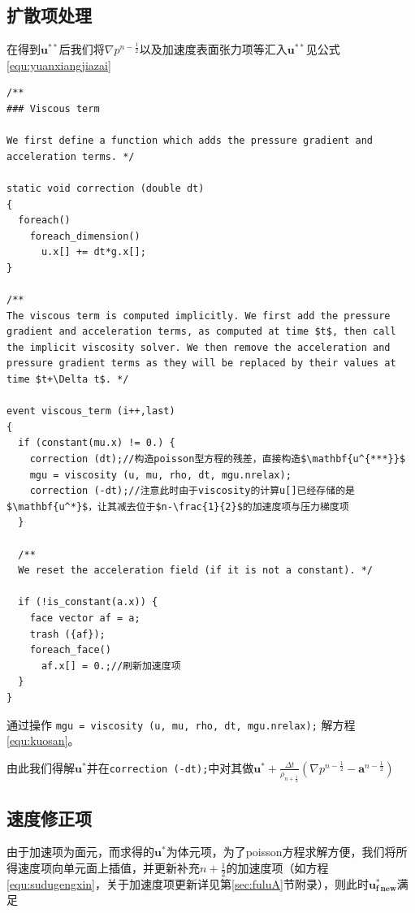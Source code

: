 \documentclass[lang=cn,11pt,a4paper]{elegantpaper}
\begin{document}
\subsection{扩散项处理}\label{sec:diffusion}
在得到$\mathbf{u^{**}}$后我们将$\nabla p^{n-\frac{1}{2}}$以及加速度表面张力项等汇入$\mathbf{u^{**}}$见公式\ref{equ:yuanxiangjiazai}
\begin{verbatim}
/**
### Viscous term

We first define a function which adds the pressure gradient and
acceleration terms. */

static void correction (double dt)
{
  foreach()
    foreach_dimension()
      u.x[] += dt*g.x[];
}

/**
The viscous term is computed implicitly. We first add the pressure
gradient and acceleration terms, as computed at time $t$, then call
the implicit viscosity solver. We then remove the acceleration and
pressure gradient terms as they will be replaced by their values at
time $t+\Delta t$. */

event viscous_term (i++,last)
{
  if (constant(mu.x) != 0.) {
    correction (dt);//构造poisson型方程的残差，直接构造$\mathbf{u^{***}}$
    mgu = viscosity (u, mu, rho, dt, mgu.nrelax);
    correction (-dt);//注意此时由于viscosity的计算u[]已经存储的是$\mathbf{u^*}$，让其减去位于$n-\frac{1}{2}$的加速度项与压力梯度项
  }

  /**
  We reset the acceleration field (if it is not a constant). */

  if (!is_constant(a.x)) {
    face vector af = a;
    trash ({af});
    foreach_face()
      af.x[] = 0.;//刷新加速度项
  }
}
\end{verbatim}

通过操作
\texttt{mgu = viscosity (u, mu, rho, dt, mgu.nrelax);}
解方程\ref{equ:kuosan}。\par
由此我们得解$\mathbf{u^{*}}$并在\texttt{correction (-dt);}中对其做$\mathbf{u^*}+\frac{\Delta t}{\rho_{n+\frac{1}{2}}}(\nabla p^{n-\frac{1}{2}}-\mathbf{a}^{n-\frac{1}{2}})$

\subsection{速度修正项}\label{sec:projection}
由于加速项为面元，而求得的$\mathbf{u^{*}}$为体元项，为了poisson方程求解方便，我们将所得速度项向单元面上插值，并更新补充$n+\frac{1}{2}$的加速度项（如方程\ref{equ:sudugengxin}，关于加速度项更新详见第\ref{sec:fuluA}节附录），则此时$\mathbf{u^*_{f\ new}}$满足
\end{document}
